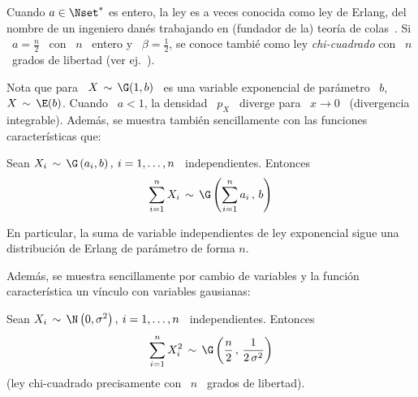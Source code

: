 Cuando $a \in \Nset^*$ es entero, la ley es a veces conocida como ley de Erlang,
del nombre  de un ingeniero dan\'es  trabajando en (fundador de  la) teor\'ia de
colas~\cite{Cox62, Erl09, Erl25, BroHal48}.  Si \  $a = \frac{n}{2}$ \ con \ $n$
\ entero y  \ $\beta = \frac12$, se conoce tambi\'e  como ley {\em chi-cuadrado}
con \ $n$ \ grados de libertad (ver ej.~\cite{JohKot95:v1}).

Nota  que para  \  $X \,  \sim  \, \G(1,b)$  \ es  una  variable exponencial  de
par\'ametro \  $b$, \ie \ $X \,  \sim \, \E(b)$. Cuando  \ $a < 1$,  la densidad \
$p_X$  \ diverge  para \  $x  \to 0$  \ (divergencia  integrable). Adem\'as,  se
muestra tambi\'en sencillamente con las funciones caracter\'isticas que:
%
\begin{lema}[Stabilidad]
\label{Lem:MP:StabilidadGamma}
%
  Sean $X_i  \, \sim  \, \G\left( a_i  , b  \right), \: i  = 1 ,  \ldots ,  n$ \
  independientes. Entonces
  \[
  \sum_{i=1}^n X_i \, \sim \, \G\left( \sum_{i=1}^n a_i \, , \, b \right)
  \]
\end{lema}
%
En particular, la  suma de variable independientes de  ley exponencial sigue una
distribuci\'on de Erlang de par\'ametro de forma $n$.

Adem\'as,  se muestra  sencillamente  por  cambio de  variables  y la  funci\'on
caracter\'istica un v\'inculo con variables gausianas:
%
\begin{lema}
\label{Lem:MP:VinculoGammaGaussiana}
%
  Sean $X_i \, \sim \,  \N\left( 0 , \sigma^2 \right), \: i = 1  , \ldots , n$ \
  independientes. Entonces
  \[
  \sum_{i=1}^n  X_i^2 \,  \sim \,  \G\left( \frac{n}{2}  \, ,  \,  \frac{1}{2 \,
      \sigma^2} \right)
  \]
  (ley chi-cuadrado precisamente con \ $n$ \ grados de libertad).
\end{lema}

